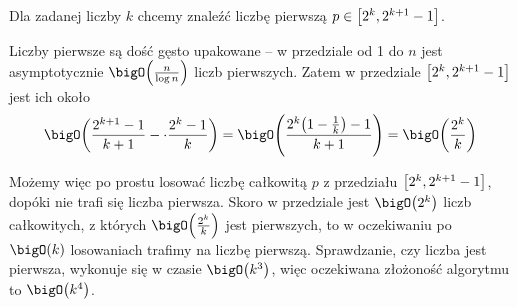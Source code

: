 Dla zadanej liczby \( k \) chcemy znaleźć liczbę pierwszą \( p \in \left[2^k, 2^{k+1}-1\right] \).

Liczby pierwsze są dość gęsto upakowane -- w przedziale od 1 do \( n \) jest asymptotycznie \( \bigO\pars{\frac{n}{\log n}} \) liczb pierwszych.
Zatem w przedziale \( \left[2^k, 2^{k+1}-1\right] \) jest ich około
\[
    \bigO\pars{\frac{2^{k+1} - 1}{k+1} - \cdot \frac{2^{k} - 1}{k}} = \bigO\pars{\frac{2^k\pars{1-\frac{1}{k}} - 1}{k+1}} = \bigO\pars{\frac{2^k}{k}}
\]

Możemy więc po prostu losować liczbę całkowitą \( p \) z przedziału \( \left[2^k, 2^{k+1}-1\right] \), dopóki nie trafi się liczba pierwsza.
Skoro w przedziale jest \( \bigO\pars{2^k} \) liczb całkowitych, z których \( \bigO\pars{\frac{2^k}{k}} \) jest pierwszych, to w oczekiwaniu po \( \bigO(k) \) losowaniach trafimy na liczbę pierwszą.
Sprawdzanie, czy liczba jest pierwsza, wykonuje się w czasie \( \bigO\pars{k^3} \), więc oczekiwana złożoność algorytmu to \( \bigO\pars{k^4} \).